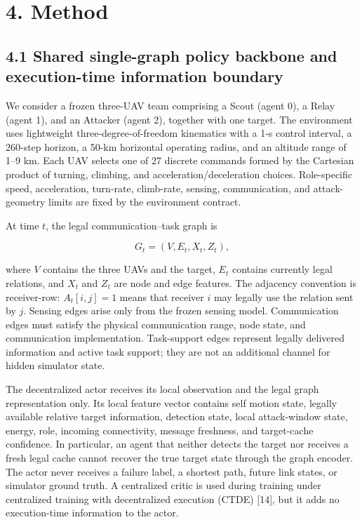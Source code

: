 \section{4. Method}

\subsection{4.1 Shared single-graph policy backbone and execution-time information boundary}

We consider a frozen three-UAV team comprising a Scout (agent 0), a Relay (agent 1), and an Attacker (agent 2), together with one target. The environment uses lightweight three-degree-of-freedom kinematics with a 1-s control interval, a 260-step horizon, a 50-km horizontal operating radius, and an altitude range of 1--9 km. Each UAV selects one of 27 discrete commands formed by the Cartesian product of turning, climbing, and acceleration/deceleration choices. Role-specific speed, acceleration, turn-rate, climb-rate, sensing, communication, and attack-geometry limits are fixed by the environment contract.

At time \(t\), the legal communication--task graph is

\[
G_t=(V,E_t,X_t,Z_t),
\]

where \(V\) contains the three UAVs and the target, \(E_t\) contains currently legal relations, and \(X_t\) and \(Z_t\) are node and edge features. The adjacency convention is receiver-row: \(A_t[i,j]=1\) means that receiver \(i\) may legally use the relation sent by \(j\). Sensing edges arise only from the frozen sensing model. Communication edges must satisfy the physical communication range, node state, and communication implementation. Task-support edges represent legally delivered information and active task support; they are not an additional channel for hidden simulator state.

The decentralized actor receives its local observation and the legal graph representation only. Its local feature vector contains self motion state, legally available relative target information, detection state, local attack-window state, energy, role, incoming connectivity, message freshness, and target-cache confidence. In particular, an agent that neither detects the target nor receives a fresh legal cache cannot recover the true target state through the graph encoder. The actor never receives a failure label, a shortest path, future link states, or simulator ground truth. A centralized critic is used during training under centralized training with decentralized execution (CTDE) [14], but it adds no execution-time information to the actor.

